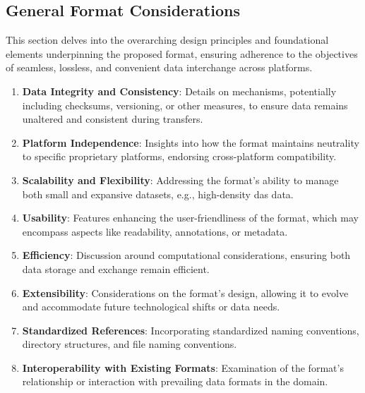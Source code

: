 \subsection{General Format Considerations}

This section delves into the overarching design principles and foundational elements underpinning the proposed format, ensuring adherence to the objectives of seamless, lossless, and convenient data interchange across platforms.

\begin{enumerate}
    \item \textbf{Data Integrity and Consistency}: Details on mechanisms, potentially including checksums, versioning, or other measures, to ensure data remains unaltered and consistent during transfers.
    
    \item \textbf{Platform Independence}: Insights into how the format maintains neutrality to specific proprietary platforms, endorsing cross-platform compatibility.
    
    \item \textbf{Scalability and Flexibility}: Addressing the format's ability to manage both small and expansive datasets, e.g., high-density \gls{das} data.
    
    \item \textbf{Usability}: Features enhancing the user-friendliness of the format, which may encompass aspects like readability, annotations, or metadata.
    
    \item \textbf{Efficiency}: Discussion around computational considerations, ensuring both data storage and exchange remain efficient.
    
    \item \textbf{Extensibility}: Considerations on the format's design, allowing it to evolve and accommodate future technological shifts or data needs.
    
    \item \textbf{Standardized References}: Incorporating standardized naming conventions, directory structures, and file naming conventions.
    
    \item \textbf{Interoperability with Existing Formats}: Examination of the format's relationship or interaction with prevailing data formats in the domain.
\end{enumerate}
